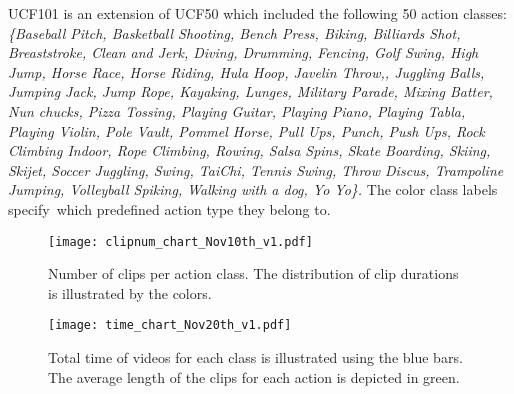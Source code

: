 \documentclass[10pt,twocolumn,letterpaper]{article}
\begin{document}
UCF101 is an extension of UCF50 which included the following 50 action classes:
\emph{\{{\color{ForestGreen}Baseball Pitch, Basketball Shooting, Bench Press, Biking, Billiards Shot, Breaststroke, Clean and Jerk, Diving,} {\color{YellowOrange}Drumming}, {\color{ForestGreen}Fencing, Golf Swing, High Jump, Horse Race, Horse Riding,} {\color{NavyBlue}Hula Hoop}, {\color{ForestGreen}Javelin Throw,}, {\color{NavyBlue}Juggling Balls}, {\color{red}Jumping Jack}, {\color{NavyBlue}Jump Rope}, {\color{ForestGreen}Kayaking,} {\color{red}Lunges}, {\color{RoyalPurple}Military Parade}, {\color{NavyBlue}Mixing Batter}, {\color{NavyBlue}Nun chucks}, {\color{NavyBlue}Pizza Tossing}, {\color{YellowOrange}Playing Guitar}, {\color{YellowOrange}Playing Piano}, {\color{YellowOrange}Playing Tabla}, {\color{YellowOrange}Playing Violin}, {\color{ForestGreen}Pole Vault, Pommel Horse,} {\color{red}Pull Ups}, {\color{ForestGreen}Punch,} {\color{red}Push Ups}, {\color{red}Rock Climbing Indoor}, {\color{red}Rope Climbing}, {\color{ForestGreen}Rowing,} {\color{RoyalPurple}Salsa Spins}, {\color{NavyBlue}Skate Boarding}, {\color{ForestGreen}Skiing, Skijet,} {\color{NavyBlue}Soccer Juggling}, {\color{red}Swing}, {\color{red}TaiChi}, {\color{ForestGreen}Tennis Swing}, {\color{ForestGreen}Throw Discus}, {\color{red}Trampoline Jumping}, {\color{ForestGreen}Volleyball Spiking,} {\color{red}Walking with a dog}, {\color{NavyBlue}Yo Yo}\}.}
The color class labels specify\ which predefined action type they belong to.



\begin{figure*}
\begin{center}
   \texttt{[image: clipnum\_chart\_Nov10th\_v1.pdf]}
\end{center}
   \caption{Number of clips per action class. The distribution of clip durations is illustrated by the colors.}
\label{fig:clipchart}
\end{figure*}

\begin{figure*}
\begin{center}
   \texttt{[image: time\_chart\_Nov20th\_v1.pdf]}
\end{center}
   \caption{Total time of videos for each class is illustrated using the blue bars. The average length of the clips for each action is depicted in green.}
\label{fig:timechart}
\end{figure*}
\end{document}

